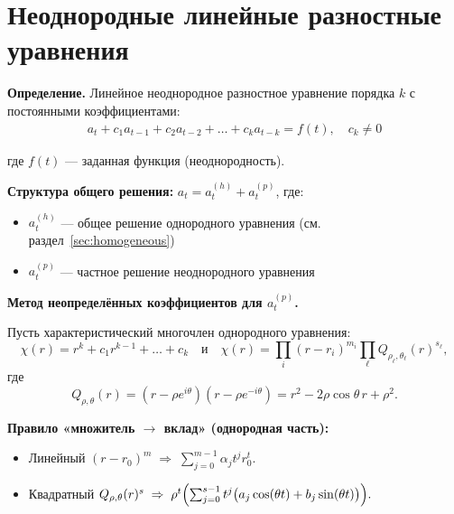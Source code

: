 \section{Неоднородные линейные разностные уравнения}\label{sec:inhomogeneous}

\begin{center}
\end{center}

\textbf{Определение.} Линейное неоднородное разностное уравнение порядка $k$ с постоянными коэффициентами:
\begin{align}
a_t + c_1 a_{t-1} + c_2 a_{t-2} + \dots + c_k a_{t-k} = f(t), \quad c_k \neq 0
\end{align}

где $f(t)$ — заданная функция (неоднородность).

\textbf{Структура общего решения:} $a_t = a_t^{(h)} + a_t^{(p)}$, где:
\begin{itemize}
\item $a_t^{(h)}$ — общее решение однородного уравнения (см. раздел~\ref{sec:homogeneous})
\item $a_t^{(p)}$ — частное решение неоднородного уравнения
\end{itemize}

\textbf{Метод неопределённых коэффициентов для $a_t^{(p)}$.}

Пусть характеристический многочлен однородного уравнения:
\[
\chi(r) = r^k + c_1 r^{k-1} + \dots + c_k
\quad \text{и} \quad
\chi(r) = \prod_i (r-r_i)^{m_i} \prod_\ell Q_{\rho_\ell, \theta_\ell}(r)^{s_\ell},
\]
где
\[
Q_{\rho,\theta}(r) = (r - \rho e^{i\theta})(r - \rho e^{-i\theta}) = r^2 - 2\rho \cos\theta \, r + \rho^2.
\]

\textbf{Правило «множитель $\to$ вклад» (однородная часть):}

\begin{itemize}
\item Линейный $(r-r_0)^m \;\Rightarrow\; \sum_{j=0}^{m-1} \alpha_j t^j r_0^t.$

\item Квадратный $Q_{\rho,\theta}(r)^s \;\Rightarrow\;
\rho^t \Bigl( \sum_{j=0}^{s-1} t^j \bigl(a_j \cos(\theta t) + b_j \sin(\theta t)\bigr)\Bigr).$
\end{itemize}

